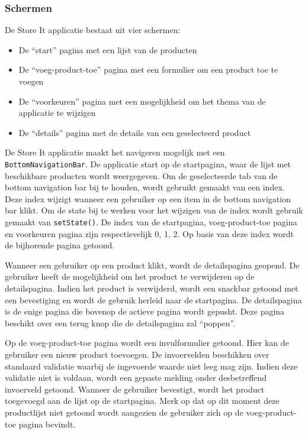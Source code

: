 \subsubsection{Schermen}
De Store It applicatie bestaat uit vier schermen: 
\begin{itemize}
    \item De ``start'' pagina met een lijst van de producten
    \item De ``voeg-product-toe'' pagina met een formulier om een product toe te voegen
    \item De ``voorkeuren'' pagina met een mogelijkheid om het thema van de applicatie te wijzigen
    \item De ``details'' pagina met de details van een geselecteerd product
\end{itemize}

De Store It applicatie maakt het navigeren mogelijk met een \verb|BottomNavigationBar|. De applicatie start op de startpagina, waar de lijst met beschikbare producten wordt weergegeven. Om de geselecteerde tab van de bottom navigation bar bij te houden, wordt gebruikt gemaakt van een index. Deze index wijzigt wanneer een gebruiker op een item in de bottom navigation bar klikt. Om de state bij te werken voor het wijzigen van de index wordt gebruik gemaakt van \verb|setState()|. De index van de startpagina, voeg-product-toe pagina en voorkeuren pagina zijn respectievelijk 0, 1, 2.
Op basis van deze index wordt de bijhorende pagina getoond.

Wanneer een gebruiker op een product klikt, wordt de detailspagina geopend. \newline
De gebruiker heeft de mogelijkheid om het product te verwijderen op de detailspagina. Indien het product is verwijderd, wordt een snackbar getoond met een bevestiging en wordt de gebruik herleid naar de startpagina.
De detailspagina is de enige pagina die bovenop de actieve pagina wordt gepusht. Deze pagina beschikt over een terug knop die de detailspagina zal ``poppen''.

Op de voeg-product-toe pagina wordt een invulformulier getoond. Hier kan de gebruiker een nieuw product toevoegen. De invoervelden beschikken over standaard validatie waarbij de ingevoerde waarde niet leeg mag zijn. Indien deze validatie niet is voldaan, wordt een gepaste melding onder desbetreffend invoerveld getoond. \newline
Wanneer de gebruiker bevestigt, wordt het product toegevoegd aan de lijst op de startpagina. Merk op dat op dit moment deze productlijst niet getoond wordt aangezien de gebruiker zich op de voeg-product-toe pagina bevindt.

